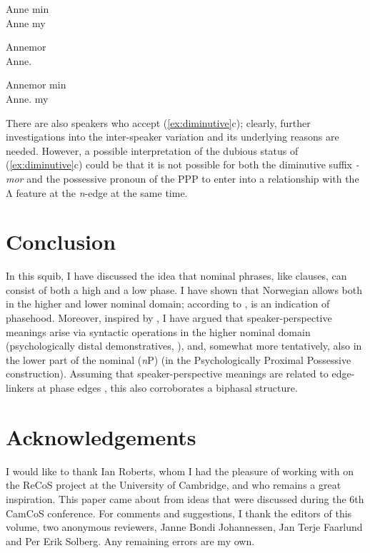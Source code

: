 \documentclass[output=paper]{langsci/langscibook}
\begin{document}
\ea\label{ex:diminutive}
		\gll Anne min\\
	Anne my {}\\
\glt

	\gll Annemor \\
	Anne.\Dim{}\\
\glt

    \gll {}Annemor min\\
	    {}Anne.\Dim{} my\\
    \glt
	\z
\z

\noindent There are also  speakers who accept (\ref{ex:diminutive}c); clearly,
further investigations into the inter-speaker variation and its underlying
reasons are needed. However, a possible interpretation of the dubious status of
(\ref{ex:diminutive}c) could be that it is not possible for both the diminutive
suffix \emph{-mor} and the possessive pronoun of the  PPP to enter into a
relationship with the Λ feature at the \emph{n}-edge
at the same time.

\section{Conclusion}

In this squib, I have discussed the idea that  nominal phrases, like
clauses,  can consist of both a high and a low phase. I have shown that
Norwegian allows  both in the higher and lower nominal domain;
according to \citet{Boskovic2014},  is an indication of phasehood.
Moreover, inspired by \textcite{sigurdsson2014context}, I have argued that
speaker-perspective meanings arise via syntactic operations in the higher
nominal domain (psychologically distal
demonstratives,
\citealt{johannessen2008psycological}), and, somewhat more tentatively, also in the lower part of the nominal
(\emph{n}P)  (in the Psychologically Proximal Possessive construction).
Assuming that speaker-perspective meanings are related
to edge-linkers at phase edges \citep{sigurdsson2014context}, this
also corroborates a biphasal structure.

\section*{Acknowledgements}

I would like to thank Ian Roberts, whom I had the pleasure of working with on
the ReCoS project at the University of Cambridge, and who remains a great
inspiration. This paper came about from ideas that were discussed during the
6th CamCoS conference. For comments and suggestions, I thank the editors of
this volume, two anonymous reviewers, Janne Bondi Johannessen, Jan Terje
Faarlund and Per Erik Solberg.  Any remaining errors are my own.

\printchapterglossary{}

{\sloppy
\printbibliography[heading=subbibliography,notkeyword=this]
}
\end{document}
